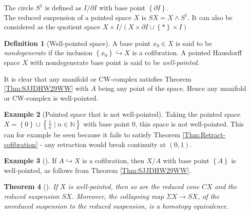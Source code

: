 \documentclass[reqno]{amsart}
\newtheorem{theorem}{Theorem}[section]
\theoremstyle{definition}
\newtheorem{definition}[theorem]{Definition}
\newtheorem{example}[theorem]{Example}
\theoremstyle{remark}
\begin{document}
The circle $S^{1}$ is defined as
$I / \partial I$ with base point $\left\{ \partial I \right\} $.\\
The reduced suspension of a pointed space $X$ is
$SX = X \wedge S^{1}$. It can also be considered
as the quotient space $X \times I / \left( X \times 
\partial I \cup  \left\{ * \right\} \times I\right) $


\begin{definition}[Well-pointed space]
    A base point $x_0 \in X$ is said to be
    \textit{nondegenerate} if the inclusion
    $\left\{ x_0 \right\} \hookrightarrow X$ is a cofibration.
    A pointed Hausdorff space $X$ with nondegenerate
    base point is said to be \textit{well-pointed}.
\end{definition}

It is clear that any manifold or CW-complex satisfies
Theorem \ref{Thm:SJJDHW29WW} with $A$ being any point of
the space. Hence any manifold or CW-complex is
well-pointed.\\

\begin{example}[Pointed space that is not well-pointed]
    Taking the pointed space  $X = 
    \left\{ 0 \right\} \cup  \left\{ \frac{1}{n} \mid 
    n \in \mathbb{N} \right\} $ with base point $0$, this
    space is not well-pointed. This can for example be
    seen because it fails to satisfy Theorem
    \ref{Thm:Retract-cofibration} - any retraction
    would break continuity at
    $\left( 0,1 \right) $.
\end{example}

\begin{example}[]
    If $A \hookrightarrow X$ is a cofibration, then
    $X / A$ with base point $\left\{ A \right\} $ is well-pointed,
    as follows from Theorem \ref{Thm:SJJDHW29WW}.
\end{example}

\begin{theorem}[]
    If $X$ is well-pointed, then so are the reduced
    cone $CX$ and the reduced suspension $SX$. Moreover,
    the collapsing map  $\Sigma X \to SX$, of the unreduced
    suspension to the reduced suspension, is a homotopy
    equivalence.
\end{theorem}
\end{document}
